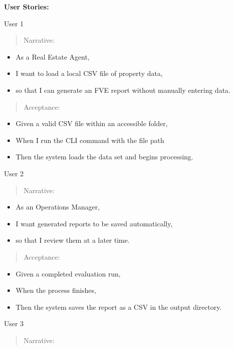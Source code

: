 \documentclass[
]{article}
\begin{document}
\textbf{User Stories:}

User 1

\begin{quote}
Narrative:
\end{quote}

\begin{itemize}
\item
  As a Real Estate Agent,
\item
  I want to load a local CSV file of property data,
\item
  so that I can generate an FVE report without manually entering data.
\end{itemize}

\begin{quote}
Acceptance:
\end{quote}

\begin{itemize}
\item
  Given a valid CSV file within an accessible folder,
\item
  When I run the CLI command with the file path
\item
  Then the system loads the data set and begins processing.
\end{itemize}

User 2

\begin{quote}
Narrative:
\end{quote}

\begin{itemize}
\item
  As an Operations Manager,
\item
  I want generated reports to be saved automatically,
\item
  so that I review them at a later time.
\end{itemize}

\begin{quote}
Acceptance:
\end{quote}

\begin{itemize}
\item
  Given a completed evaluation run,
\item
  When the process finishes,
\item
  Then the system saves the report as a CSV in the output directory.
\end{itemize}

User 3

\begin{quote}
Narrative:
\end{quote}
\end{document}
